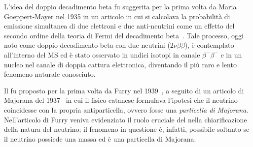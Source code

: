 L'idea del doppio decadimento beta fu suggerita per la prima volta da Maria Goeppert-Mayer nel 1935 in un articolo in cui si calcolava la probabilità di emissione simultanea di due elettroni e due anti-neutrini come un effetto del secondo ordine della teoria di Fermi del decadimento beta~\cite{goeppert-mayer:pr35}. 
Tale processo, oggi noto come doppio decadimento beta con due neutrini ($ 2\nu\beta\beta $), è contemplato all'interno del MS ed è stato osservato in undici isotopi in canale $\beta^- \beta^-$ e in un nucleo nel canale di doppia cattura elettronica, diventando il più raro e lento fenomeno naturale conosciuto.
 


Il \doppiobeta{} fu proposto per la prima volta da Furry nel 1939~\cite{furry:pr39}, a seguito di un articolo di Majorana del 1937~\cite{majorana:nc37} in cui il fisico catanese formulava l'ipotesi che il neutrino coincidesse con la propria antiparticella, ovvero fosse una \emph{particella di Majorana}. 
Nell'articolo di Furry veniva evidenziato il ruolo cruciale del \doppiobeta{} nella chiarificazione della natura del neutrino; il fenomeno in questione è, infatti, possibile soltanto se il neutrino possiede una massa ed è una particella di Majorana. 



